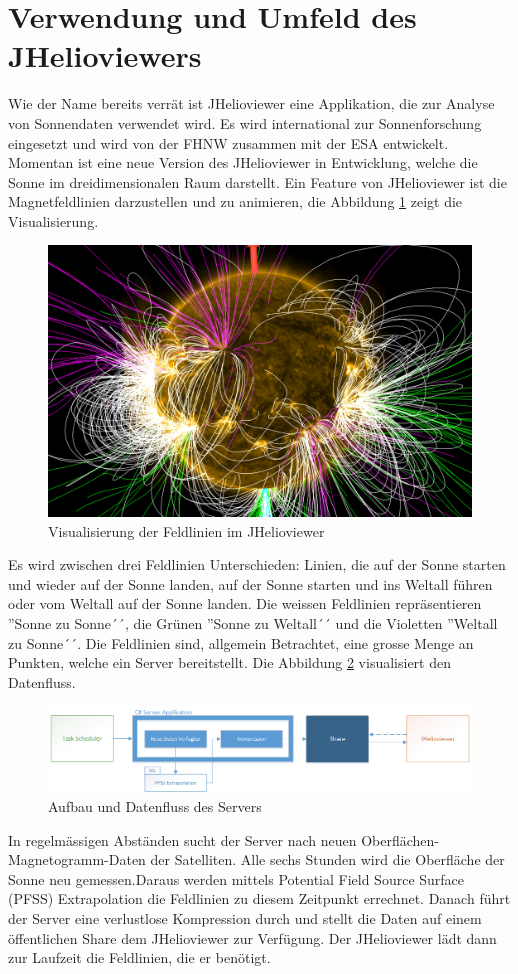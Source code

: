 \section{Verwendung und Umfeld des JHelioviewers}
Wie der Name bereits verrät ist JHelioviewer eine Applikation,  die zur Analyse von Sonnendaten verwendet wird. Es wird international zur Sonnenforschung eingesetzt und wird von der FHNW zusammen mit der ESA entwickelt. Momentan ist eine neue Version des JHelioviewer in Entwicklung, welche die Sonne im dreidimensionalen Raum darstellt. Ein Feature von JHelioviewer ist die Magnetfeldlinien darzustellen und zu animieren, die Abbildung \ref{einleitung::feldlinien} zeigt die Visualisierung.
\begin{figure}[!htbp]
\center
	\includegraphics[scale=0.5]{./pictures/einleitung/fieldLines.png}
	\caption{Visualisierung der Feldlinien im JHelioviewer}
	\label{einleitung::feldlinien}
\end{figure}
Es wird zwischen drei Feldlinien Unterschieden: Linien, die auf der Sonne starten und wieder auf der Sonne landen, auf der Sonne starten und ins Weltall führen oder vom Weltall auf der Sonne landen. Die weissen Feldlinien repräsentieren ''Sonne zu Sonne´´, die Grünen ''Sonne zu Weltall´´ und die Violetten ''Weltall zu Sonne´´. Die Feldlinien sind, allgemein Betrachtet, eine grosse Menge an Punkten, welche ein Server bereitstellt. Die Abbildung \ref{einleitung::aufbau} visualisiert den Datenfluss.
\begin{figure}[!htbp]
\center
	\includegraphics[scale=0.5]{./pictures/einleitung/server.png}
	\caption{Aufbau und Datenfluss des Servers}
	\label{einleitung::aufbau}
\end{figure}
In regelmässigen Abständen sucht der Server nach neuen Oberflächen-Magnetogramm-Daten der Satelliten. Alle sechs Stunden wird die Oberfläche der Sonne neu gemessen.Daraus werden mittels Potential Field Source Surface (PFSS) Extrapolation die Feldlinien zu diesem Zeitpunkt errechnet. Danach führt der Server eine verlustlose Kompression durch und stellt die Daten auf einem öffentlichen Share dem JHelioviewer zur Verfügung. Der JHelioviewer lädt dann zur Laufzeit die Feldlinien, die er benötigt. 

